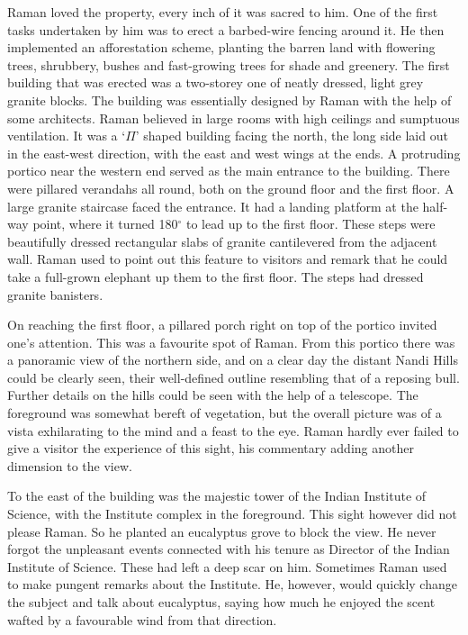 Raman loved the property, every inch of it was sacred to
him. One of the first tasks undertaken by him was to erect a
barbed-wire fencing around it. He then implemented an
afforestation scheme, planting the barren land with flowering
trees, shrubbery, bushes and fast-growing trees for shade and
greenery. The first building that was erected was a two-storey
one of neatly dressed, light grey granite blocks. The building was
essentially designed by Raman with the help of some architects.
Raman believed in large rooms with high ceilings and sumptuous
ventilation. It was a `$\Pi$' shaped building facing the north, the long
side laid out in the east-west direction, with the east and west
wings at the ends. A protruding portico near the western end
served as the main entrance to the building. There were pillared
verandahs all round, both on the ground floor and the first floor.
A large granite staircase faced the entrance. It had a landing
platform at the half-way point, where it turned 180$^{\circ}$ to lead up
to the first floor. These steps were beautifully dressed rectangular
slabs of granite cantilevered from the adjacent wall. Raman used
to point out this feature to visitors and remark that he could take
a full-grown elephant up them to the first floor. The steps had
dressed granite banisters.

On reaching the first floor, a pillared porch right on top of
the portico invited one's attention. This was a favourite spot of
Raman. From this portico there was a panoramic view of the
northern side, and on a clear day the distant Nandi Hills could
be clearly seen, their well-defined outline resembling that of a
reposing bull. Further details on the hills could be seen with the
help of a telescope. The foreground was somewhat bereft of
vegetation, but the overall picture was of a vista exhilarating to
the mind and a feast to the eye. Raman hardly ever failed to give
a visitor the experience of this sight, his commentary adding
another dimension to the view.

To the east of the building was the majestic tower of the
Indian Institute of Science, with the Institute complex in the
foreground. This sight however did not please Raman. So he
planted an eucalyptus grove to block the view. He never forgot
the unpleasant events connected with his tenure as Director of
the Indian Institute of Science. These had left a deep scar on him.
Sometimes Raman used to make pungent remarks about the
Institute. He, however, would quickly change the subject and
talk about eucalyptus, saying how much he enjoyed the scent
wafted by a favourable wind from that direction.

